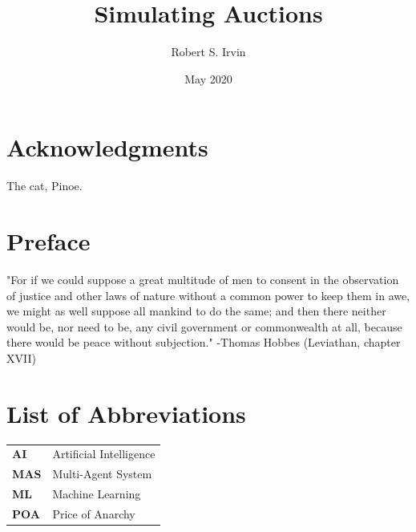 \documentclass[12pt,twoside]{reedthesis}
\title{Simulating Auctions}
\author{Robert S. Irvin}
\date{May 2020}
\begin{document}
  \maketitle
  \frontmatter %
  \pagestyle{empty} %

    \chapter*{Acknowledgments}
	The cat, Pinoe.

    \chapter*{Preface}
	"For if we could suppose a great multitude of men to consent in the observation of justice and other laws of nature without a common power to keep them in awe, we might as well suppose all mankind to do the same; and then there neither would be, nor need to be, any civil government or commonwealth at all, because there would be peace without subjection." -Thomas Hobbes (Leviathan, chapter XVII)
	
	

    \chapter*{List of Abbreviations}

	\begin{table}[h]
	\centering %
	\begin{tabular}{ll}
		\textbf{AI}  	&  Artificial Intelligence\\
		\textbf{MAS}  	&  Multi-Agent System\\
		\textbf{ML}     &  Machine Learning\\
		\textbf{POA}    &  Price of Anarchy
	\end{tabular}
	\end{table}
	

    \tableofcontents
    \listoftables
    \listoffigures

\end{document}

